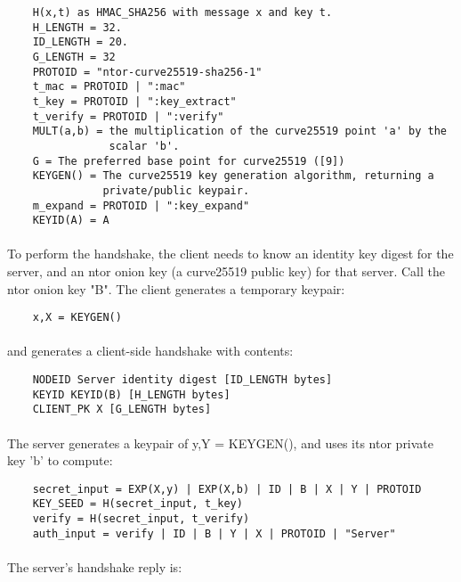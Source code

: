 \begin{verbatim}
    H(x,t) as HMAC_SHA256 with message x and key t.
    H_LENGTH = 32.
    ID_LENGTH = 20.
    G_LENGTH = 32
    PROTOID = "ntor-curve25519-sha256-1"
    t_mac = PROTOID | ":mac"
    t_key = PROTOID | ":key_extract"
    t_verify = PROTOID | ":verify"
    MULT(a,b) = the multiplication of the curve25519 point 'a' by the
                scalar 'b'.
    G = The preferred base point for curve25519 ([9])
    KEYGEN() = The curve25519 key generation algorithm, returning a
               private/public keypair.
    m_expand = PROTOID | ":key_expand"
    KEYID(A) = A
\end{verbatim}

\paragraph{}
To perform the handshake, the client needs to know an identity key
digest for the server, and an ntor onion key (a curve25519 public
key) for that server. Call the ntor onion key "B". The client
generates a temporary keypair:

\begin{verbatim}
    x,X = KEYGEN()
\end{verbatim}

\paragraph{}
and generates a client-side handshake with contents:
\begin{verbatim}
    NODEID Server identity digest [ID_LENGTH bytes]
    KEYID KEYID(B) [H_LENGTH bytes]
    CLIENT_PK X [G_LENGTH bytes]
\end{verbatim}

\paragraph{}
The server generates a keypair of y,Y = KEYGEN(), and uses its ntor
private key 'b' to compute:

\begin{verbatim}
    secret_input = EXP(X,y) | EXP(X,b) | ID | B | X | Y | PROTOID
    KEY_SEED = H(secret_input, t_key)
    verify = H(secret_input, t_verify)
    auth_input = verify | ID | B | Y | X | PROTOID | "Server"
\end{verbatim}

\paragraph{}
The server's handshake reply is:

